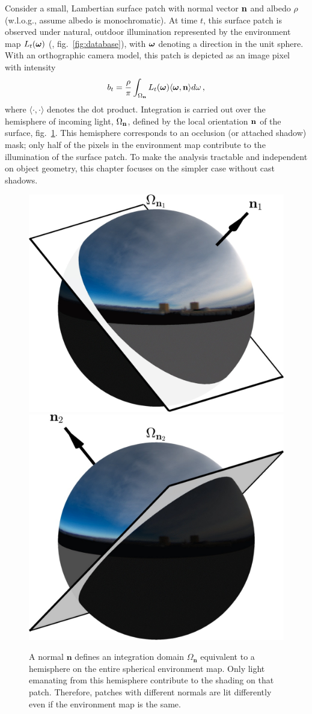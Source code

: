 Consider a small, Lambertian surface patch with normal vector ${\bf n}$ and albedo $\rho$ (w.l.o.g., assume albedo is monochromatic). At time $t$, this surface patch is observed under natural, outdoor illumination represented by the environment map $L_t(\boldsymbol \omega)$ (\eg, fig.~\ref{fig:database}), with $\boldsymbol \omega$ denoting a direction in the unit sphere. With an orthographic camera model, this patch is depicted as an image pixel with intensity
%
\begin{equation}
    b_t = \frac{\rho}{\pi} \int_{\Omega_{\bf n}} L_t(\mathbf{\boldsymbol \omega}) \langle \boldsymbol \omega, {\bf n} \rangle d\omega \,,
    \label{eqn:imageformation-continuous}
\end{equation}
%
where $\langle \cdot, \cdot \rangle$ denotes the dot product. Integration is carried out over the hemisphere of incoming light, $\Omega_{\bf n}$, defined by the local orientation ${\bf n}$ of the surface, fig.~\ref{fig:normal-diagram}. This hemisphere corresponds to an occlusion (or attached shadow) mask; only half of the pixels in the environment map contribute to the illumination of the surface patch. To make the analysis tractable and independent on object geometry, this chapter focuses on the simpler case without cast shadows.

\begin{figure}
    \centering
    \includegraphics[width=.495\linewidth]{./figures/diagramFig/diagram1.jpg}
    \includegraphics[width=.495\linewidth]{./figures/diagramFig/diagram2.jpg}
    \caption[Hemispheres defined by surface normals]{A normal $\mathbf{n}$ defines an integration domain $\Omega_{\mathbf{n}}$ equivalent to a hemisphere on the entire spherical environment map. Only light emanating from this hemisphere contribute to the shading on that patch. Therefore, patches with different normals are lit differently even if the environment map is the same.}
    \label{fig:normal-diagram}
\end{figure}

